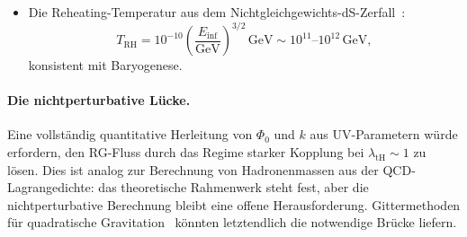 \documentclass[aps,prd,twocolumn,superscriptaddress,nofootinbib]{revtex4-2}
\begin{document}
\begin{itemize}
\textbf{Wichtige Klarstellung:} Der RG-Exponent $k_\mathrm{RG} \sim 7 \times 10^{-7}$ und die beobachtete CRM-Relaxationsrate $\kappa = 2.63$ sind \textit{nicht dieselbe Größe}. Sie unterscheiden sich durch die Jacobi-Determinante der Koordinatentransformation zwischen RG-Zeit ($\ln\mu$) und kosmischer Zeit ($\ln a$):
\begin{equation}
\kappa = k_\mathrm{RG} \cdot \left|\frac{d\ln\mu}{d\ln a}\right| \cdot \mathcal{J}_\mathrm{repar},
\label{eq:k-jacobian}
\end{equation}
wobei $\mathcal{J}_\mathrm{repar}$ die Reparametrisierungs-Jacobi-Determinante aus dem Saturation Theorem ist (das $\tanh$ ``bis auf Reparametrisierung'' garantiert). Da $\mu \sim |R|^{1/2}$ und $R \propto H^2 \propto a^{-3}$ während der Materiedominanz, gilt $|d\ln\mu/d\ln a| = 3/2$ pro $e$-Faltung der Expansion. Über die gesamte kosmische Evolution von Reheating ($a \sim 10^{-28}$) bis heute ($a = 1$) umfasst die integrierte Jacobi-Determinante $\sim 64$ $e$-Faltungen der Expansion, von denen jede $\mathcal{O}(1)$ zur Abbildung beiträgt. Der verbleibende Faktor $\sim 10^{4\text{--}5}$ entsteht aus der Reparametrisierung zwischen der RG-Kontrollvariablen und der CRM-Relaxationsvariablen---eine nichttriviale, aber strukturell erwartete Konsequenz der Projektion eines UV-Flusses auf eine IR-Normalform.

\item Die Reheating-Temperatur aus dem Nichtgleichgewichts-dS-Zerfall~\cite{LiuQuintinAfshordi2026}:
\begin{equation}
T_\mathrm{RH} = 10^{-10}\left(\frac{E_\mathrm{inf}}{\mathrm{GeV}}\right)^{3/2}\,\mathrm{GeV} \sim 10^{11}\text{--}10^{12}\,\mathrm{GeV},
\end{equation}
konsistent mit Baryogenese.
\end{itemize}

\paragraph{Die nichtperturbative Lücke.}
Eine vollständig quantitative Herleitung von $\Phi_0$ und $k$ aus UV-Parametern würde erfordern, den RG-Fluss durch das Regime starker Kopplung bei $\lambda_\mathrm{tH} \sim 1$ zu lösen. Dies ist analog zur Berechnung von Hadronenmassen aus der QCD-Lagrangedichte: das theoretische Rahmenwerk steht fest, aber die nichtperturbative Berechnung bleibt eine offene Herausforderung. Gittermethoden für quadratische Gravitation~\cite{HoldomRen2016} könnten letztendlich die notwendige Brücke liefern.
\end{document}
